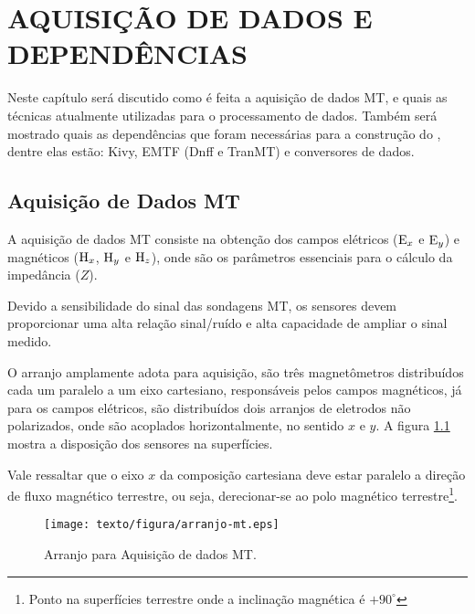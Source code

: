 \chapter{AQUISIÇÃO DE DADOS E DEPENDÊNCIAS}
    
    Neste capítulo será discutido como é feita a aquisição de dados MT, e quais as técnicas atualmente utilizadas para o processamento de dados. Também será mostrado quais as dependências que foram necessárias para a construção do \software, dentre elas estão: Kivy, EMTF (Dnff e TranMT) e conversores de dados.
        
    \section{Aquisição de Dados MT}        
    
        A aquisição de dados MT consiste na obtenção dos campos elétricos ($\textrm{E}_x$ e $\textrm{E}_y$) e magnéticos ($\textrm{H}_x$, $\textrm{H}_y$ e $\textrm{H}_z$), onde são os parâmetros essenciais para o cálculo da impedância ($Z$).
        
        Devido a sensibilidade do sinal das sondagens MT, os sensores devem proporcionar uma alta relação sinal/ruído e alta capacidade de ampliar o sinal medido.
        
        O arranjo amplamente adota para aquisição, são três magnetômetros distribuídos cada um paralelo a um eixo cartesiano, responsáveis pelos campos magnéticos, já para os campos elétricos, são distribuídos dois arranjos de eletrodos não polarizados, onde são acoplados horizontalmente, no sentido $x$ e $y$. A figura \ref{fig-arranjo-mt} mostra a disposição dos sensores na superfícies.
        
        Vale ressaltar que o eixo $x$ da composição cartesiana deve estar paralelo a direção de fluxo magnético terrestre, ou seja, derecionar-se ao polo magnético terrestre\footnote{Ponto na superfícies terrestre onde a inclinação magnética é $+90^\circ$}. 
        
        \begin{figure}[H]
            \caption{Arranjo para Aquisição de dados MT.}
                \begin{center}
                    \texttt{[image: texto/figura/arranjo-mt.eps]}
                \end{center}
            \label{fig-arranjo-mt}
        \end{figure}
        
